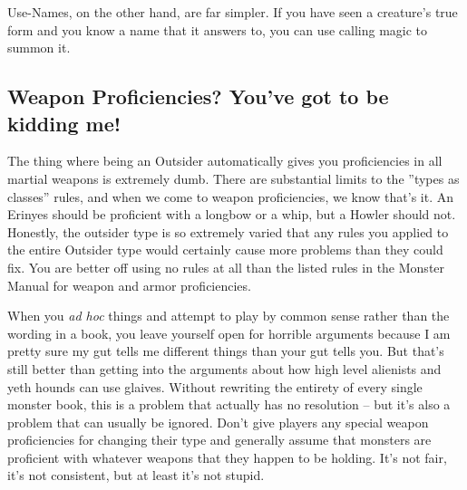 Use-Names, on the other hand, are far simpler. If you have seen a creature's true form and you know a name that it answers to, you can use calling magic to summon it.

\subsection{Weapon Proficiencies? You've got to be kidding me!}
The thing where being an Outsider automatically gives you proficiencies in all martial weapons is extremely dumb. There are substantial limits to the ''types as classes'' rules, and when we come to weapon proficiencies, we know that's it. An Erinyes should be proficient with a longbow or a whip, but a Howler should not. Honestly, the outsider type is so extremely varied that any rules you applied to the entire Outsider type would certainly cause more problems than they could fix. You are better off using no rules at all than the listed rules in the Monster Manual for weapon and armor proficiencies.

When you \emph{ad hoc} things and attempt to play by common sense rather than the wording in a book, you leave yourself open for horrible arguments because I am pretty sure my gut tells me different things than your gut tells you. But that's still better than getting into the arguments about how high level alienists and yeth hounds can use glaives. Without rewriting the entirety of every single monster book, this is a problem that actually has no resolution -- but it's also a problem that can usually be ignored. Don't give players any special weapon proficiencies for changing their type and generally assume that monsters are proficient with whatever weapons that they happen to be holding. It's not fair, it's not consistent, but at least it's not stupid.
